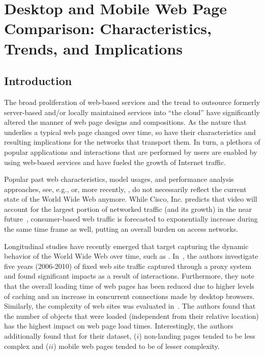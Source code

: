\chapter{Desktop and Mobile Web Page Comparison: Characteristics, Trends, and Implications}

\section*{Introduction}

The broad proliferation of web-based services and the trend to outsource formerly server-based and/or locally maintained services into ``the cloud'' have significantly altered the manner of web page designs and compositions.
As the nature that underlies a typical web page changed over time, so have their characteristics and resulting implications for the networks that transport them.
In turn, a plethora of popular applications and interactions that are performed by users are enabled by using web-based services and have fueled the growth of Internet traffic.

Popular past web characteristics, model usages, and performance analysis approaches, see, e.g., \cite{BaCr98} or, more recently, \cite{LiZhZhChGr10}, do  not necessarily reflect the current state of the World Wide Web anymore.
While Cisco, Inc. predicts that video will account for the largest portion of networked traffic (and its growth) in the near future~\cite{Ci13}, consumer-based web traffic is forecasted to exponentially increase during the same time frame as well, putting an overall burden on access networks.

Longitudinal studies have recently emerged that target capturing the dynamic behavior of the World Wide Web over time, such as \cite{CaAlPa10}.
In~\cite{IhPa11}, the authors investigate five years (2006-2010) of fixed web site traffic captured through a proxy system and found significant impacts as a result of interactions.
Furthermore, they note that the overall loading time of web pages has been reduced due to higher levels of caching and an increase in concurrent connections made by desktop browsers.
Similarly, the complexity of web sites was evaluated in~\cite{BuMaSe11,BuMaSe13}. The authors found that the number of objects that were loaded (independent from their relative location) has the highest impact on web page load times.
Interestingly, the authors additionally found that for their dataset, ($i$) non-landing pages tended to be less complex and ($ii$) mobile web pages tended to be of lesser complexity.


